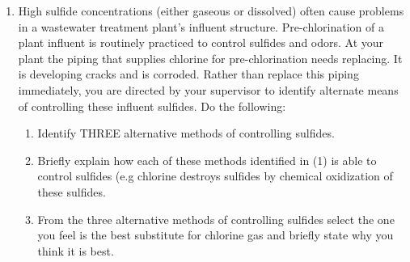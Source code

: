 \begin{enumerate}
\item High sulfide concentrations (either gaseous or dissolved) often cause problems in a wastewater treatment plant’s influent structure. Pre-chlorination of a plant influent is routinely practiced to control sulfides and odors. At your plant the piping that supplies chlorine for pre-chlorination needs replacing. It is developing cracks and is corroded. Rather than replace this piping immediately, you are directed by your supervisor to identify alternate means of controlling these influent sulfides. 
Do the following:
\begin{enumerate}
\item Identify THREE alternative methods of controlling sulfides.
\item Briefly explain how each of these methods identified in (1) is able to control sulfides (e.g chlorine destroys sulfides by chemical oxidization of these sulfides. 
\item From the three alternative methods of controlling sulfides select the one you feel is the best substitute for chlorine gas and briefly state why you think it is best.
\end{enumerate}


\end{enumerate}
